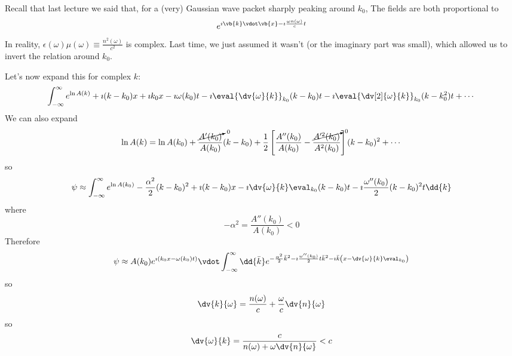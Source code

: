 \documentclass[a4paper,twoside,master.tex]{subfiles}
\begin{document}

Recall that last lecture we said that, for a (very) Gaussian wave packet sharply peaking around $ k_0 $, The fields are both proportional to
\begin{equation}
    e^{\imath \vb{k} \vdot \vb{x} - \imath \frac{\omega n(\omega)}{c} t}
\end{equation}
In reality, $ \epsilon(\omega) \mu(\omega) \equiv \frac{n^2(\omega)}{c^2} $ is complex. Last time, we just assumed it wasn't (or the imaginary part was small), which allowed us to invert the relation around $ k_0 $.

Let's now expand this for complex $ k $:
\begin{equation}
    \int_{- \infty}^{\infty} e^{\ln{A(k)}} + \imath (k - k_0)x + \imath k_0 x - \imath \omega(k_0) t - \imath \eval{\dv{\omega}{k}}_{k_0}(k-k_0)t - \imath \eval{\dv[2]{\omega}{k}}_{k_0}(k-k_0^2)t + \cdots
\end{equation}
We can also expand
\begin{equation}
    \ln{A(k)} = \ln{A(k_0)} + \frac{\cancelto{0}{A'(k_0)}}{A(k_0)} (k-k_0) + \frac{1}{2} \left[ \frac{A''(k_0)}{A(k_0)} - \frac{\cancelto{0}{A'^2(k_0)}}{A^2(k_0)} \right](k - k_0)^2 + \cdots
\end{equation}
so
\begin{equation}
    \psi \approx \int_{- \infty}^{\infty} e^{\ln{A(k_0)}} - \frac{\alpha^2}{2} (k-k_0)^2 + \imath (k-k_0)x - \imath \dv{\omega}{k}\eval_{k_0}(k-k_0)t - \imath \frac{\omega''(k_0)}{2} (k-k_0)^2 t \dd{k}
\end{equation}
where
\begin{equation}
    - \alpha^2 = \frac{A''(k_0)}{A(k_0)} < 0
\end{equation}
Therefore
\begin{equation}
    \psi \approx A(k_0) e^{\imath (k_0 x - \omega(k_0) t)} \vdot \int_{- \infty}^{\infty} \dd{\bar{k}} e^{- \frac{\alpha^2}{2} \bar{k}^2 - \imath \frac{\omega''(k_0)}{2} t \bar{k}^2 - \imath \bar{k} \left( x - \dv{\omega}{k}\eval_{k_0} \right)}
\end{equation}
so
\begin{equation}
    \dv{k}{\omega}= \frac{n(\omega)}{c} + \frac{\omega}{c} \dv{n}{\omega}
\end{equation}
so
\begin{equation}
    \dv{\omega}{k}= \frac{c}{n(\omega) + \omega \dv{n}{\omega}} < c
\end{equation}
\end{document}
